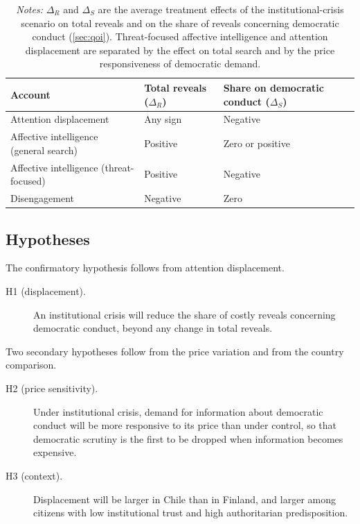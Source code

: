 \documentclass[11pt]{article}
\begin{document}
\begin{table}[!htbp]
\centering
\caption{Competing accounts and their predictions for costly search}
\label{tab:predictions}
\footnotesize
\begin{tabularx}{\textwidth}{p{3.2cm} X X}
\toprule
\textbf{Account} & \textbf{Total reveals ($\Delta_R$)} & \textbf{Share on democratic conduct ($\Delta_S$)} \\
\midrule
Attention displacement & Any sign & Negative \\
Affective intelligence (general search) & Positive & Zero or positive \\
Affective intelligence (threat-focused) & Positive & Negative \\
Disengagement & Negative & Zero \\
\bottomrule
\end{tabularx}
\caption*{\footnotesize\textit{Notes:} $\Delta_R$ and $\Delta_S$ are the average treatment effects of the institutional-crisis scenario on total reveals and on the share of reveals concerning democratic conduct (\cref{sec:qoi}). Threat-focused affective intelligence and attention displacement are separated by the effect on total search and by the price responsiveness of democratic demand.}
\end{table}

\subsection{Hypotheses}

The confirmatory hypothesis follows from attention displacement.

\begin{description}
\item[H1 (displacement).] An institutional crisis will reduce the share of costly reveals concerning democratic conduct, beyond any change in total reveals.
\end{description}

Two secondary hypotheses follow from the price variation and from the country comparison.

\begin{description}
\item[H2 (price sensitivity).] Under institutional crisis, demand for information about democratic conduct will be more responsive to its price than under control, so that democratic scrutiny is the first to be dropped when information becomes expensive.
\item[H3 (context).] Displacement will be larger in Chile than in Finland, and larger among citizens with low institutional trust and high authoritarian predisposition.
\end{description}
\end{document}
